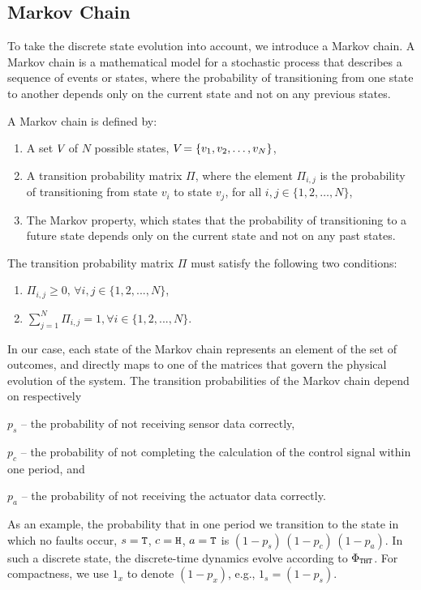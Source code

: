 \subsection{Markov Chain}%
\label{sec:mc}%

To take the discrete state evolution into account, we introduce a Markov chain.
A Markov chain is a mathematical model for a stochastic process that describes a sequence of events or states, where the probability of transitioning from one state to another depends only on the current state and not on any previous states.

\begin{definition}
    A Markov chain is defined by:
    \begin{enumerate}[label=(\roman*)]
        \item A set $V_{}$ of $N$ possible states, $V_{} = \{ v_1, v_2, \dots, v_N \}$,
        \item A transition probability matrix $\Pi$, where the element $\Pi_{i, j}$ is the probability of transitioning from state $v_i$ to state $v_j$, for all $i,j \in \{ 1,2, \dots ,N \}$,
        \item The Markov property, which states that the probability of transitioning to a future state depends only on the current state and not on any past states.
    \end{enumerate}
    The transition probability matrix $\Pi$ must satisfy the following two conditions:
    \begin{enumerate}[label=(\roman*)]
        \itemsep1pt
        \item $\Pi_{i, j} \geq 0, \, \forall i,j \in \{1,2,...,N\}$,
        \item $\sum^{N}_{j=1} \Pi_{i, j} = 1, \forall i \in \{1,2,...,N\}$.
    \end{enumerate}
\end{definition}

In our case, each state of the Markov chain represents an element of the set of outcomes, and directly maps to one of the matrices that govern the physical evolution of the system.
The transition probabilities of the Markov chain depend on respectively
\begin{enumerate*}[label=(\roman*)]
    \item $p_s$ -- the probability of not receiving sensor data correctly,
    \item $p_c$ -- the probability of not completing the calculation of the control signal within one period, and
    \item $p_a$ -- the probability of not receiving the actuator data correctly.
\end{enumerate*}
As an example, the probability that in one period we transition to the state in which no faults occur, $s=\texttt{T}$, $c=\texttt{H}$, $a=\texttt{T}$ is $(1-p_s)\,(1-p_c)\,(1-p_a)$.
In such a discrete state, the discrete-time dynamics evolve according to $\Phi_{\texttt{T}\texttt{H}\texttt{T}}$.
For compactness, we use $1_x$ to denote $(1-p_x)$, e.g., $1_s = (1-p_s)$.

